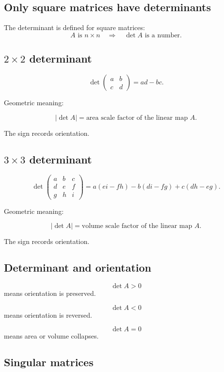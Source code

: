 \subsection*{Only square matrices have determinants}

The determinant is defined for square matrices:
\[
\boxed{
    A\text{ is }n\times n
    \quad\Longrightarrow\quad
    \det A\text{ is a number}.
}
\]

\subsection*{\(2\times2\) determinant}

\[
\boxed{
    \det
    \begin{pmatrix}
    a&b\\
    c&d
    \end{pmatrix}
    =
    ad-bc.
}
\]

Geometric meaning:

\[
\boxed{
    |\det A|
    =
    \text{area scale factor of the linear map }A.
}
\]

The sign records orientation.

\subsection*{\(3\times3\) determinant}

\[
\boxed{
\det
\begin{pmatrix}
a&b&c\\
d&e&f\\
g&h&i
\end{pmatrix}
=
a(ei-fh)-b(di-fg)+c(dh-eg).
}
\]

Geometric meaning:

\[
\boxed{
    |\det A|
    =
    \text{volume scale factor of the linear map }A.
}
\]

The sign records orientation.

\subsection*{Determinant and orientation}

\[
\boxed{
    \det A>0
}
\]
means orientation is preserved.

\[
\boxed{
    \det A<0
}
\]
means orientation is reversed.

\[
\boxed{
    \det A=0
}
\]
means area or volume collapses.

\subsection*{Singular matrices}

